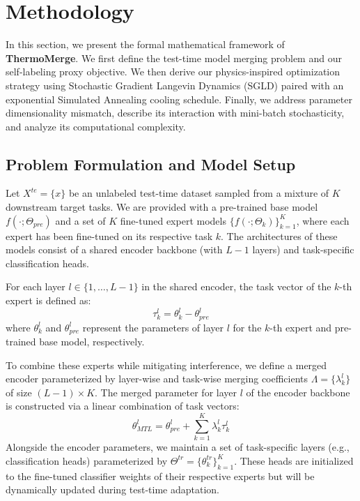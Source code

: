 \section{Methodology}
\label{sec:method}

In this section, we present the formal mathematical framework of \textbf{ThermoMerge}.
We first define the test-time model merging problem and our self-labeling proxy objective.
We then derive our physics-inspired optimization strategy using Stochastic Gradient Langevin Dynamics (SGLD) paired with an exponential Simulated Annealing cooling schedule.
Finally, we address parameter dimensionality mismatch, describe its interaction with mini-batch stochasticity, and analyze its computational complexity.

\subsection{Problem Formulation and Model Setup}
Let $X^{te} = \{x\}$ be an unlabeled test-time dataset sampled from a mixture of $K$ downstream target tasks.
We are provided with a pre-trained base model $f(\cdot; \Theta_{pre})$ and a set of $K$ fine-tuned expert models $\{f(\cdot; \Theta_k)\}_{k=1}^K$, where each expert has been fine-tuned on its respective task $k$.
The architectures of these models consist of a shared encoder backbone (with $L-1$ layers) and task-specific classification heads.

For each layer $l \in \{1, \dots, L-1\}$ in the shared encoder, the task vector of the $k$-th expert is defined as:
\begin{equation}
    \tau_k^l = \theta_k^l - \theta_{pre}^l
\end{equation}
where $\theta_k^l$ and $\theta_{pre}^l$ represent the parameters of layer $l$ for the $k$-th expert and pre-trained base model, respectively.

To combine these experts while mitigating interference, we define a merged encoder parameterized by layer-wise and task-wise merging coefficients $\Lambda = \{\lambda_k^l\}$ of size $(L-1) \times K$.
The merged parameter for layer $l$ of the encoder backbone is constructed via a linear combination of task vectors:
\begin{equation}
    \theta_{MTL}^l = \theta_{pre}^l + \sum_{k=1}^K \lambda_k^l \tau_k^l
\end{equation}
Alongside the encoder parameters, we maintain a set of task-specific layers (e.g., classification heads) parameterized by $\Theta^{tr} = \{\theta_k^{tr}\}_{k=1}^K$.
These heads are initialized to the fine-tuned classifier weights of their respective experts but will be dynamically updated during test-time adaptation.

